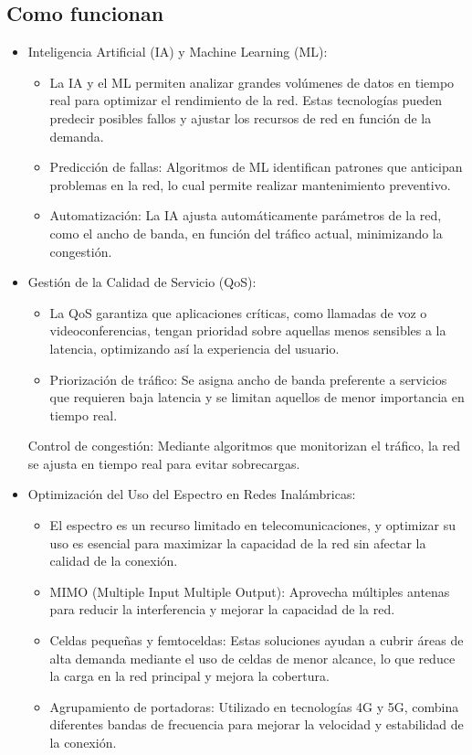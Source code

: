 \documentclass[12pt]{article}
\begin{document}
\subsection{Como funcionan}
\begin{itemize}
    \item Inteligencia Artificial (IA) y Machine Learning (ML):
    \begin{itemize}
        \item La IA y el ML permiten analizar grandes volúmenes de datos en tiempo real para optimizar el rendimiento de la red. Estas tecnologías 
        pueden predecir posibles fallos y ajustar los recursos de red en función de la demanda.
        \item Predicción de fallas: Algoritmos de ML identifican patrones que anticipan problemas en la red, lo cual permite realizar mantenimiento 
        preventivo.
        \item Automatización: La IA ajusta automáticamente parámetros de la red, como el ancho de banda, en función del tráfico actual, 
        minimizando la congestión. 
    \end{itemize}

    \item Gestión de la Calidad de Servicio (QoS):
    \begin{itemize}
        \item La QoS garantiza que aplicaciones críticas, como llamadas de voz o videoconferencias, tengan prioridad sobre aquellas menos 
        sensibles a la latencia, optimizando así la experiencia del usuario.
        \item Priorización de tráfico: Se asigna ancho de banda preferente a servicios que requieren baja latencia y se limitan aquellos de
        menor importancia en tiempo real. 
    \end{itemize}

    Control de congestión: Mediante algoritmos que monitorizan el tráfico, la red se ajusta en tiempo real para evitar sobrecargas.
    \item Optimización del Uso del Espectro en Redes Inalámbricas:
    \begin{itemize}
        \item El espectro es un recurso limitado en telecomunicaciones, y optimizar su uso es esencial para maximizar la capacidad de la red 
        sin afectar la calidad de la conexión.
        \item MIMO (Multiple Input Multiple Output): Aprovecha múltiples antenas para reducir la interferencia y mejorar la capacidad de la red.
        \item Celdas pequeñas y femtoceldas: Estas soluciones ayudan a cubrir áreas de alta demanda mediante el uso de celdas de menor alcance, 
        lo que reduce la carga en la red principal y mejora la cobertura.
        \item Agrupamiento de portadoras: Utilizado en tecnologías 4G y 5G, combina diferentes bandas de frecuencia para mejorar la velocidad 
        y estabilidad de la conexión.
    \end{itemize}


\end{itemize}
\end{document}
